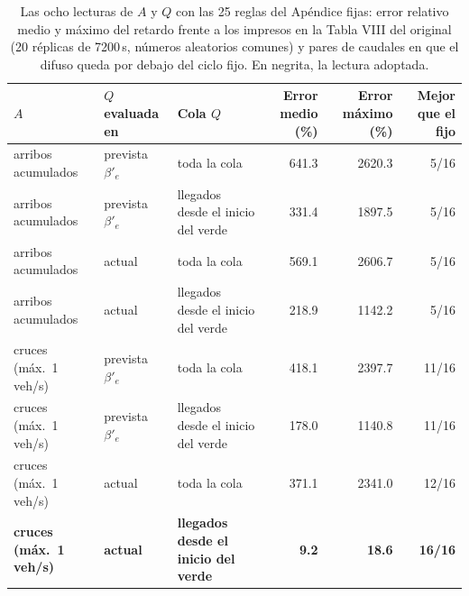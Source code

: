 \begin{table}[t]
\centering
\caption{Las ocho lecturas de $A$ y $Q$ con las 25 reglas del Ap\'endice fijas: error relativo medio y m\'aximo del retardo frente a los impresos en la Tabla VIII del original (20 r\'eplicas de 7200\,s, n\'umeros aleatorios comunes) y pares de caudales en que el difuso queda por debajo del ciclo fijo. En negrita, la lectura adoptada.}
\label{tab:slecturas}
\scriptsize
\begin{tabular}{@{}lllrrr@{}}
\toprule
$A$ & $Q$ evaluada en & Cola $Q$ & Error medio (\%) & Error m\'aximo (\%) & Mejor que el fijo \\
\midrule
arribos acumulados & prevista $\beta'_e$ & toda la cola & 641.3 & 2620.3 & 5/16 \\
arribos acumulados & prevista $\beta'_e$ & llegados desde el inicio del verde & 331.4 & 1897.5 & 5/16 \\
arribos acumulados & actual & toda la cola & 569.1 & 2606.7 & 5/16 \\
arribos acumulados & actual & llegados desde el inicio del verde & 218.9 & 1142.2 & 5/16 \\
cruces (m\'ax.\ 1 veh/s) & prevista $\beta'_e$ & toda la cola & 418.1 & 2397.7 & 11/16 \\
cruces (m\'ax.\ 1 veh/s) & prevista $\beta'_e$ & llegados desde el inicio del verde & 178.0 & 1140.8 & 11/16 \\
cruces (m\'ax.\ 1 veh/s) & actual & toda la cola & 371.1 & 2341.0 & 12/16 \\
\textbf{cruces (m\'ax.\ 1 veh/s)} & \textbf{actual} & \textbf{llegados desde el inicio del verde} & \textbf{9.2} & \textbf{18.6} & \textbf{16/16} \\
\bottomrule
\end{tabular}
\end{table}
